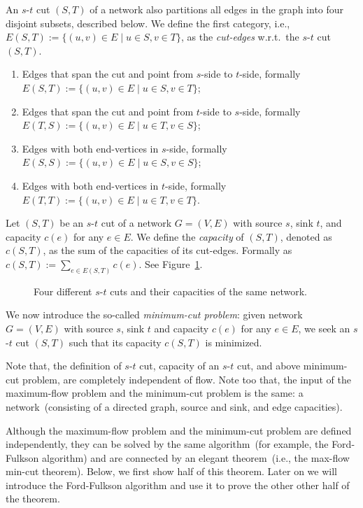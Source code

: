 An $s$-$t$ cut $(S, T)$ of a network also partitions all
edges in the graph into four disjoint subsets, described below. 
We define the first category, i.e., $E(S, T) := \{(u,v)\in E\mid u\in S, v\in T\}$,
as the \emph{cut-edges} w.r.t.\ the $s$-$t$ cut $(S, T)$.
\begin{enumerate}
\item Edges that span the cut and point from $s$-side to $t$-side, formally $E(S, T) := \{(u,v)\in E\mid u\in S, v\in T\}$;
\item Edges that span the cut and point from $t$-side to $s$-side, formally $E(T, S) := \{(u,v)\in E\mid u\in T, v\in S\}$;
\item Edges with both end-vertices in $s$-side, formally $E(S, S) := \{(u,v)\in E\mid u\in S, v\in S\}$;
\item Edges with both end-vertices in $t$-side, formally $E(T, T) := \{(u,v)\in E\mid u\in T, v\in T\}$.
\end{enumerate}

Let $(S, T)$ be an $s$-$t$ cut of a network $G = (V, E)$ with source $s$, sink $t$, and capacity $c(e)$ for any $e\in E$.
We define the \emph{capacity} of $(S, T)$, denoted as $c(S, T)$, as the sum of the capacities of its cut-edges. Formally
as $c(S, T) := \sum_{e\in E(S, T)} c(e)$. See Figure~\ref{fig:flow-cut}.

\begin{figure}[h]
\centering{}
\caption{Four different $s$-$t$ cuts and their capacities of the same network.}
\label{fig:flow-cut}
\end{figure}

We now introduce the so-called \emph{minimum-cut problem}: given network $G = (V, E)$ with source $s$, sink $t$ and capacity $c(e)$ for any $e\in E$,
   we seek an $s$-$t$ cut $(S, T)$ such that its capacity $c(S, T)$ is minimized.

Note that, the definition of $s$-$t$ cut, capacity of an $s$-$t$ cut, and above minimum-cut problem,
are completely independent of flow. Note too that, the input of the maximum-flow problem and the minimum-cut
problem is the same: a network~(consisting of a directed graph, source and sink, and edge capacities).

Although the maximum-flow problem and the minimum-cut problem are defined independently, they
can be solved by the same algorithm~(for example, the Ford-Fulkson algorithm)
and are connected by an elegant theorem~(i.e., the max-flow min-cut theorem).
Below, we first show half of this theorem.
Later on we will introduce the Ford-Fulkson algorithm
and use it to prove the other other half of the theorem.

